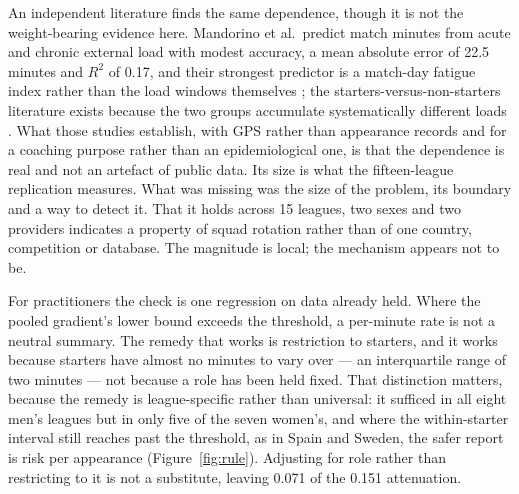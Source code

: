 \documentclass[11pt]{article}
\begin{document}
An independent literature finds the same dependence, though it is not the weight-bearing evidence here. Mandorino et al.\ predict match minutes from acute and chronic external load with modest accuracy, a mean absolute error of 22.5 minutes and $R^2$ of 0.17, and their strongest predictor is a match-day fatigue index rather than the load windows themselves \cite{mandorino2026_minutes_in_legs}; the starters-versus-non-starters literature exists because the two groups accumulate systematically different loads \cite{romero2023_starters_nonstarters}. What those studies establish, with GPS rather than appearance records and for a coaching purpose rather than an epidemiological one, is that the dependence is real and not an artefact of public data. Its size is what the fifteen-league replication measures. What was missing was the size of the problem, its boundary and a way to detect it. That it holds across 15 leagues, two sexes and two providers indicates a property of squad rotation rather than of one country, competition or database. The magnitude is local; the mechanism appears not to be.

For practitioners the check is one regression on data already held. Where the pooled gradient's lower bound exceeds the threshold, a per-minute rate is not a neutral summary. The remedy that works is restriction to starters, and it works because starters have almost no minutes to vary over --- an interquartile range of two minutes --- not because a role has been held fixed. That distinction matters, because the remedy is league-specific rather than universal: it sufficed in all eight men's leagues but in only five of the seven women's, and where the within-starter interval still reaches past the threshold, as in Spain and Sweden, the safer report is risk per appearance (Figure~\ref{fig:rule}). Adjusting for role rather than restricting to it is not a substitute, leaving 0.071 of the 0.151 attenuation.
\end{document}
